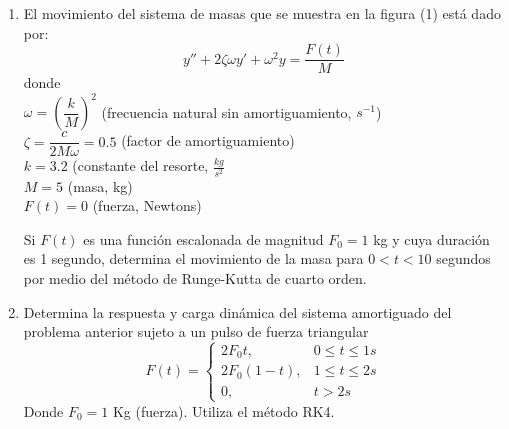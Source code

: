 \documentclass[11pt]{article}
\begin{document}
\begin{enumerate}
\item El movimiento del sistema de masas que se muestra en la figura (1) está dado por:
\[ y'' + 2 \zeta \omega y' + \omega^{2}y = \dfrac{F(t)}{M}\]
donde \\ 
$\omega = \left( \dfrac{k}{M} \right)^{2}$ (frecuencia natural sin amortiguamiento, $s^{-1}$) \\
$\zeta = \dfrac{c}{2M\omega}=0.5$ (factor de amortiguamiento) \\
$k = 3.2$ (constante del resorte, $\frac{kg}{s^{2}}$ \\
$M=5$ (masa, kg) \\
$F(t) = 0$ (fuerza, Newtons)
\begin{center}
\end{center}
Si $F(t)$ es una función escalonada de magnitud $F_{0}=1$ kg y cuya duración es 1 segundo, determina el movimiento de la masa para $0<t<10$ segundos por medio del método de Runge-Kutta de cuarto orden.
\item Determina la respuesta y carga dinámica del sistema amortiguado del problema anterior sujeto a un pulso de fuerza triangular
\begin{equation*}
F(t) =
	\begin{cases}
2F_{0}t,  & 0 \leq t \leq 1 s\\
2F_{0}(1-t), & 1 \leq t \leq 2 s\\
0, & t>2 s
\end{cases}
\end{equation*}
Donde $F_{0}=1$ Kg (fuerza). Utiliza el método RK4.
\end{enumerate}
\end{document}
